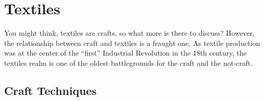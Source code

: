 
\section{Textiles}

You might think, textiles are crafts, so what more is there to discuss? However, the relationship between craft and textiles is a fraught one. As textile production was at the center of the ``first'' Industrial Revolution in the 18th century, the textiles realm is one of the oldest battlegrounds for the craft and the not-craft. 

\subsection{Craft Techniques}

